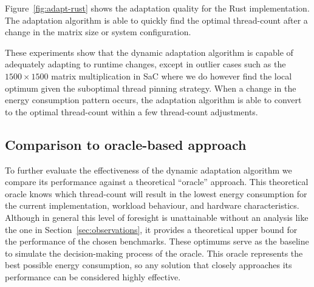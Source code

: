 \documentclass[runningheads]{llncs}
\begin{document}
Figure~\ref{fig:adapt-rust} shows the adaptation quality for the Rust implementation.
The adaptation algorithm is able to quickly find the optimal thread-count after a change in the matrix size or system configuration.

These experiments show that the dynamic adaptation algorithm is capable of adequately adapting to runtime changes, except in outlier cases such as the $1500 \times 1500$ matrix multiplication in SaC where we do however find the local optimum given the suboptimal thread pinning strategy.
When a change in the energy consumption pattern occurs, the adaptation algorithm is able to convert to the optimal thread-count within a few thread-count adjustments.

\subsection{Comparison to oracle-based approach}\label{sec:evaluation-oracle}
To further evaluate the effectiveness of the dynamic adaptation algorithm we compare its performance
against a theoretical ``oracle'' approach.
This theoretical oracle knows which thread-count will
result in the lowest energy consumption for the current implementation, workload behaviour, and
hardware characteristics.
Although in general this level of foresight is unattainable without an
analysis like the one in Section~\ref{sec:observations}, it provides a theoretical upper bound for
the performance of the chosen benchmarks.
These optimums serve as the baseline to simulate the
decision-making process of the oracle.
This oracle represents the best possible energy consumption,
so any solution that closely approaches its performance can be considered highly effective.
\end{document}
